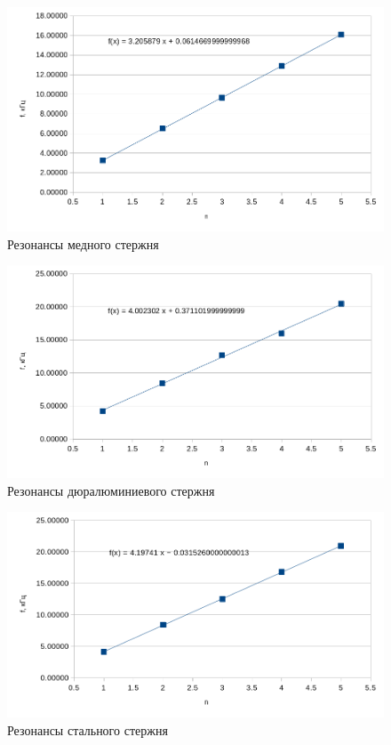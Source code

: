 \documentclass[a4, 12pt]{article}
\begin{document}
\begin{enumerate}
    \begin{figure}[H]
        \centering
        \includegraphics[scale=0.5]{med.png}
        \caption{Резонансы медного стержня}
    \end{figure}
    \begin{figure}[H]
        \centering
        \includegraphics[scale=0.5]{dur.png}
        \caption{Резонансы дюралюминиевого стержня}
    \end{figure}
    \begin{figure}[H]
        \centering
        \includegraphics[scale=0.5]{steel.png}
        \caption{Резонансы стального стержня}
    \end{figure}


\end{enumerate}
\end{document}
